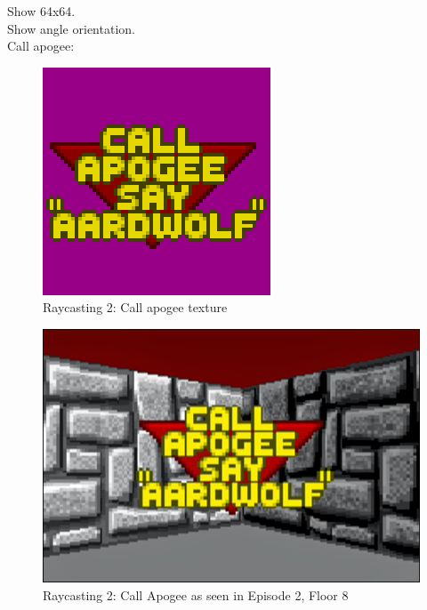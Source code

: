 \documentclass[book.tex]{subfiles}
\begin{document}
Show 64x64.\\
Show angle orientation.\\

Call apogee:\\
\begin{figure}[H]
  \centering
 \includegraphics[scale=1.3]{imgs/call_apogee_texture.png}
 \caption{Raycasting 2: Call apogee texture} \label{fig:callapogeesprite}
\end{figure}

\begin{figure}[H]
  \centering
 \includegraphics[scale=0.6]{imgs/call_apogee.png}
 \caption{Raycasting 2: Call Apogee as seen in  Episode 2, Floor 8} \label{fig:callapogeeingame}
\end{figure}
\end{document}
